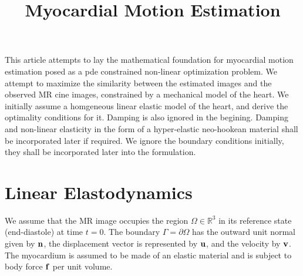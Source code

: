 \documentclass[10pt]{article}
\begin{document}
\title{Myocardial Motion Estimation} \author{} \maketitle

This article attempts to lay the mathematical foundation for myocardial motion
estimation posed as a pde constrained non-linear optimization problem. We
attempt to maximize the similarity between the estimated images and the
observed MR cine images, constrained by a mechanical model of the heart. We
initially assume a homgeneous linear elastic model of the heart, and derive
the optimality conditions for it. Damping is also ignored in the begining.
Damping and non-linear elasticity in the form of a hyper-elastic neo-hookean
material shall be incorporated later if required. We ignore the boundary
conditions initially, they shall be incorporated later into the formulation.


\section{Linear Elastodynamics}

We assume that the MR image occupies the region $\Omega \in \mathbb{R}^3$ in its reference state (end-diastole) at time $t=0$. The boundary $\Gamma=\partial\Omega$ has the outward unit normal given by $\mathbf{n}$, the displacement vector is represented by $\mathbf{u}$, and the velocity by $\mathbf{v}$. The myocardium is assumed to be made of an elastic material and is subject to body force $\mathbf{f}$ per unit volume.
\end{document}

